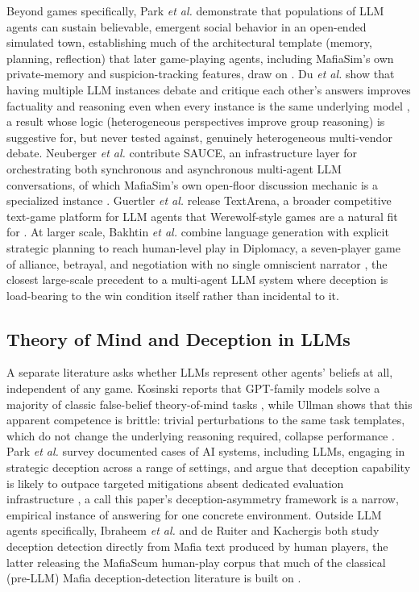 \documentclass[10pt,conference]{IEEEtran}
\begin{document}
Beyond games specifically, Park \textit{et al.} demonstrate that populations of LLM agents can sustain believable, emergent social behavior in an open-ended simulated town, establishing much of the architectural template (memory, planning, reflection) that later game-playing agents, including MafiaSim's own private-memory and suspicion-tracking features, draw on \cite{park2023generative}. Du \textit{et al.} show that having multiple LLM instances debate and critique each other's answers improves factuality and reasoning even when every instance is the same underlying model \cite{du2023debate}, a result whose logic (heterogeneous perspectives improve group reasoning) is suggestive for, but never tested against, genuinely heterogeneous multi-vendor debate. Neuberger \textit{et al.} contribute SAUCE, an infrastructure layer for orchestrating both synchronous and asynchronous multi-agent LLM conversations, of which MafiaSim's own open-floor discussion mechanic is a specialized instance \cite{neuberger2024sauce}. Guertler \textit{et al.} release TextArena, a broader competitive text-game platform for LLM agents that Werewolf-style games are a natural fit for \cite{guertler2025textarena}. At larger scale, Bakhtin \textit{et al.} combine language generation with explicit strategic planning to reach human-level play in Diplomacy, a seven-player game of alliance, betrayal, and negotiation with no single omniscient narrator \cite{bakhtin2022human}, the closest large-scale precedent to a multi-agent LLM system where deception is load-bearing to the win condition itself rather than incidental to it.

\subsection{Theory of Mind and Deception in LLMs}

A separate literature asks whether LLMs represent other agents' beliefs at all, independent of any game. Kosinski reports that GPT-family models solve a majority of classic false-belief theory-of-mind tasks \cite{kosinski2023theory}, while Ullman shows that this apparent competence is brittle: trivial perturbations to the same task templates, which do not change the underlying reasoning required, collapse performance \cite{ullman2023large}. Park \textit{et al.} survey documented cases of AI systems, including LLMs, engaging in strategic deception across a range of settings, and argue that deception capability is likely to outpace targeted mitigations absent dedicated evaluation infrastructure \cite{park2023aideception}, a call this paper's deception-asymmetry framework is a narrow, empirical instance of answering for one concrete environment. Outside LLM agents specifically, Ibraheem \textit{et al.} and de Ruiter and Kachergis both study deception detection directly from Mafia text produced by human players, the latter releasing the MafiaScum human-play corpus that much of the classical (pre-LLM) Mafia deception-detection literature is built on \cite{ibraheem2022putting,deruiter2018mafiascum}.
\end{document}
